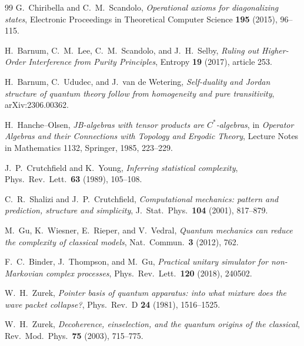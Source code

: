 \documentclass[11pt]{article}
\theoremstyle{definition}
\theoremstyle{remark}
\begin{document}
\begin{thebibliography}{99}
G.~Chiribella and C.~M.~Scandolo,
\emph{Operational axioms for diagonalizing states},
Electronic Proceedings in Theoretical Computer Science \textbf{195} (2015),
96--115.

H.~Barnum, C.~M.~Lee, C.~M.~Scandolo, and J.~H.~Selby,
\emph{Ruling out Higher-Order Interference from Purity Principles},
Entropy \textbf{19} (2017), article 253.

H.~Barnum, C.~Ududec, and J.~van de Wetering,
\emph{Self-duality and Jordan structure of quantum theory follow from
homogeneity and pure transitivity}, arXiv:2306.00362.

H.~Hanche--Olsen,
\emph{JB-algebras with tensor products are $C^*$-algebras},
in \emph{Operator Algebras and their Connections with Topology and Ergodic
Theory}, Lecture Notes in Mathematics 1132, Springer, 1985, 223--229.



J.~P.~Crutchfield and K.~Young,
\emph{Inferring statistical complexity},
Phys.\ Rev.\ Lett.\ \textbf{63} (1989), 105--108.

C.~R.~Shalizi and J.~P.~Crutchfield,
\emph{Computational mechanics: pattern and prediction, structure and
simplicity},
J.~Stat.\ Phys.\ \textbf{104} (2001), 817--879.

M.~Gu, K.~Wiesner, E.~Rieper, and V.~Vedral,
\emph{Quantum mechanics can reduce the complexity of classical models},
Nat.\ Commun.\ \textbf{3} (2012), 762.

F.~C.~Binder, J.~Thompson, and M.~Gu,
\emph{Practical unitary simulator for non-Markovian complex processes},
Phys.\ Rev.\ Lett.\ \textbf{120} (2018), 240502.


W.~H.~Zurek,
\emph{Pointer basis of quantum apparatus: into what mixture does the wave
packet collapse?},
Phys.\ Rev.\ D \textbf{24} (1981), 1516--1525.

W.~H.~Zurek,
\emph{Decoherence, einselection, and the quantum origins of the classical},
Rev.\ Mod.\ Phys.\ \textbf{75} (2003), 715--775.


\end{thebibliography}
\end{document}
